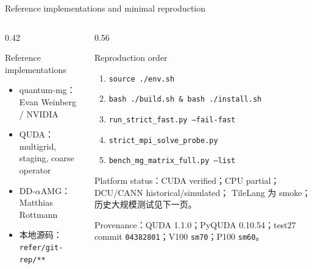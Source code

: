 \documentclass[UTF8,aspectratio=169,11pt,fontset=none]{ctexbeamer}
\newcommand{\code}[1]{\nolinkurl{#1}}
\begin{document}
\begin{frame}[t]{Reference implementations and minimal reproduction}
\begin{columns}[T,totalwidth=\textwidth]
\begin{column}{0.42\textwidth}
  \begin{block}{Reference implementations}
  \small
  \begin{itemize}
    \item quantum-mg：Evan Weinberg / NVIDIA
    \item QUDA：multigrid, staging, coarse operator
    \item DD-\(\alpha\)AMG：Matthias Rottmann
    \item 本地源码：\code{refer/git-rep/**}
  \end{itemize}
  \end{block}
\end{column}
\begin{column}{0.56\textwidth}
  \begin{block}{Reproduction order}
  \small
  \begin{enumerate}
    \item \texttt{source ./env.sh}
    \item \texttt{bash ./build.sh \&{} bash ./install.sh}
    \item \texttt{run\_strict\_fast.py --fail-fast}
    \item \texttt{strict\_mpi\_solve\_probe.py}
    \item \texttt{bench\_mg\_matrix\_full.py --list}
  \end{enumerate}
  \end{block}
  \begin{minipage}{0.98\linewidth}
  \small
  Platform status：CUDA verified；CPU partial；DCU/CANN historical/simulated；
  TileLang 为 smoke；历史大规模测试见下一页。
  \end{minipage}
  \begin{minipage}{0.98\linewidth}
  \scriptsize
  Provenance：QUDA 1.1.0；PyQUDA 0.10.54；test27 commit
  \texttt{04382801}；V100 \texttt{sm70}；P100 \texttt{sm60}。
  \end{minipage}
\end{column}
\end{columns}
\end{frame}
\end{document}
